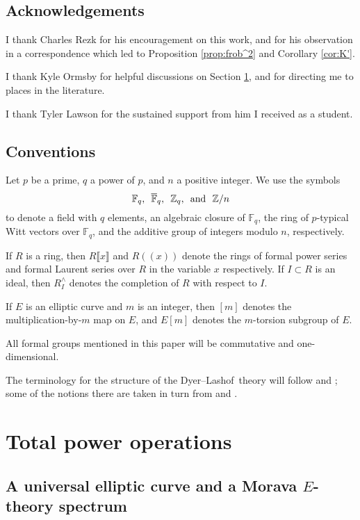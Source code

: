 \documentclass{gtpart}
\theoremstyle{definition}
\theoremstyle{remark}
\newcommand{\mb}[1]{\mathbb{#1}}
\newcommand{\cF}{\overline {\mb F}}
\newcommand{\DL}{Dyer--Lashof~}
\newcommand{\BF}{{\mb F}}
\newcommand{\BZ}{{\mb Z}}
\newcommand{\ad}{{\rm and}}
\begin{document}
\subsection{Acknowledgements}

I thank Charles Rezk for his encouragement on this work, and for his observation in a correspondence which led to Proposition \ref{prop:frob^2} and Corollary \ref{cor:K'}.  

I thank Kyle Ormsby for helpful discussions on Section \ref{sec:total}, and for directing me to places in the literature.  

I thank Tyler Lawson for the sustained support from him I received as a student.  


\subsection{Conventions}

Let $p$ be a prime, $q$ a power of $p$, and $n$ a positive integer.  We use the symbols 
\[
 \BF_q\text{,}~~\cF_q\text{,}~~\BZ_q\text{,}~~\ad~~\BZ/n 
\]
to denote a field with $q$ elements, an algebraic closure of $\BF_q$, the ring of $p$-typical Witt vectors over $\BF_q$, 
and the additive group of integers modulo $n$, respectively.  

If $R$ is a ring, then $R\llbracket x \rrbracket$ and $R (\!(x)\!)$ denote the rings of formal power series and formal Laurent series over $R$ in the variable $x$ respectively.  
If $I \subset R$ is an ideal, then $R_I^\wedge$ denotes the completion of $R$ with respect to $I$.  

If $E$ is an elliptic curve and $m$ is an integer, then $[m]$ denotes the multiplication-by-$m$ map on $E$, and $E[m]$ denotes the $m$-torsion subgroup of $E$.  

All formal groups mentioned in this paper will be commutative and one-dimensional.  

The terminology for the structure of the \DL theory will follow \cite{cong} and \cite{h2p2}; 
some of the notions there are taken in turn from \cite{BW} and \cite{V}.  


\section{Total power operations}
\label{sec:total}

\subsection{A universal elliptic curve and a Morava $E$-theory spectrum}
\label{subsec:ec}
\end{document}
